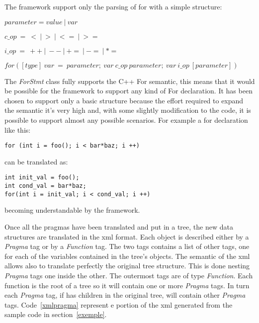 \documentclass[a4paper,11pt,oneside]{book}
\begin{document}
The framework support only the parsing of for with a simple structure: \newline

$parameter = value \ | \ var$

$c\_op \ = \ < \ | \ > \ | \ <= \ | \ >= $

$i\_op \ = \ ++ \ | \ -- \ | \ += \ | \ -= \ | \ *=$ 

$for([type] \ var \ = \ parameter; \ var \ c\_op \ parameter; \ var \ i\_op \ [parameter])$ \newline


The \emph{ForStmt} class fully supports the C++ For semantic, this means that it would be possible for the framework to support any kind of For declaration. It has been chosen to support only a basic structure because the effort required to expand the semantic it’s very high and, with some slightly modification to the code, it is possible to support almost any possible scenarios. For example a for declaration like this:

\begin{lstlisting}[language=CCC]
for (int i = foo(); i < bar*baz; i ++)
\end{lstlisting}
can be translated as:

\begin{lstlisting}[language=CCC]
int init_val = foo();
int cond_val = bar*baz;
for(int i = init_val; i < cond_val; i ++)  
\end{lstlisting}

becoming understandable by the framework.

Once all the pragmas have been translated and put in a tree, the new data structures are translated in the xml format. Each object is described either by a \emph{Pragma} tag or by a \emph{Function} tag. The two tags contains a list of other tags, one for  each of the variables contained in the tree’s objects. The semantic of the xml allows also to translate perfectly the original tree structure. This is done nesting \emph{Pragma} tags one inside the other. The outermost tags are of type \emph{Function}. Each function is the root of a tree so it will contain one or more \emph{Pragma} tags. In turn each \emph{Pragma} tag, if has children in the original tree, will contain other \emph{Pragma} tags. Code~\ref{xmlpragma} represent e portion of the xml generated from the sample code in section~\ref{exemple}.
\end{document}
